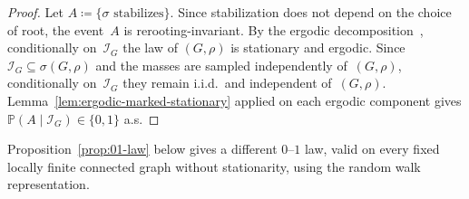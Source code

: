 \documentclass[aop]{imsart}
\theoremstyle{plain}
\theoremstyle{definition}
\renewcommand{\P}{\mathbb{P}}
\begin{document}
	\begin{proof}
		Let $A\coloneqq\{\sigma\text{ stabilizes}\}$. Since stabilization does not depend on the choice of root, the event~$A$ is rerooting-invariant. By the ergodic decomposition~\citep[Section~2.1]{BenjaminiCurien12}, conditionally on~$\mathcal{I}_G$ the law of $(G,\rho)$ is stationary and ergodic. Since $\mathcal{I}_G\subseteq\sigma(G,\rho)$ and the masses are sampled independently of~$(G,\rho)$, conditionally on~$\mathcal{I}_G$ they remain i.i.d.\ and independent of~$(G,\rho)$. Lemma~\ref{lem:ergodic-marked-stationary} applied on each ergodic component gives $\P(A\mid\mathcal{I}_G)\in\{0,1\}$ a.s.
	\end{proof}
	
	Proposition~\ref{prop:01-law} below gives a different $0$--$1$ law, valid on every fixed locally finite connected graph without stationarity, using the random walk representation.
	
\end{document}

